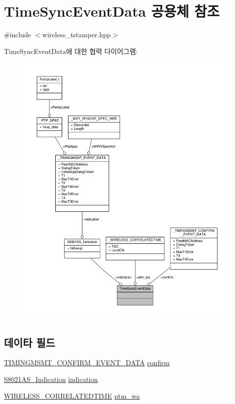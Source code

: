 \hypertarget{union_time_sync_event_data}{}\section{Time\+Sync\+Event\+Data 공용체 참조}
\label{union_time_sync_event_data}


{\ttfamily \#include $<$wireless\+\_\+tstamper.\+hpp$>$}



Time\+Sync\+Event\+Data에 대한 협력 다이어그램\+:
\nopagebreak
\begin{figure}[H]
\begin{center}
\leavevmode
\includegraphics[width=350pt]{union_time_sync_event_data__coll__graph}
\end{center}
\end{figure}
\subsection*{데이타 필드}
\begin{DoxyCompactItemize}
\item 
\hyperlink{wireless__tstamper_8hpp_afd4fbc8165dd4d488ff84de35f6eb52e}{T\+I\+M\+I\+N\+G\+M\+S\+M\+T\+\_\+\+C\+O\+N\+F\+I\+R\+M\+\_\+\+E\+V\+E\+N\+T\+\_\+\+D\+A\+TA} \hyperlink{union_time_sync_event_data_aadd0419ee3f299d785e1284b73c8db83}{confirm}
\item 
\hyperlink{struct_s8021_a_s___indication}{S8021\+A\+S\+\_\+\+Indication} \hyperlink{union_time_sync_event_data_a0258dde14ab92d18eb0381f186bd464f}{indication}
\item 
\hyperlink{wireless__tstamper_8hpp_a1a7b816d9ca6a9ad704a7b39e75a1a50}{W\+I\+R\+E\+L\+E\+S\+S\+\_\+\+C\+O\+R\+R\+E\+L\+A\+T\+E\+D\+T\+I\+ME} \hyperlink{union_time_sync_event_data_ab4125e6fe4a30fb6626b81a6a66b7413}{ptm\+\_\+wa}
\end{DoxyCompactItemize}


